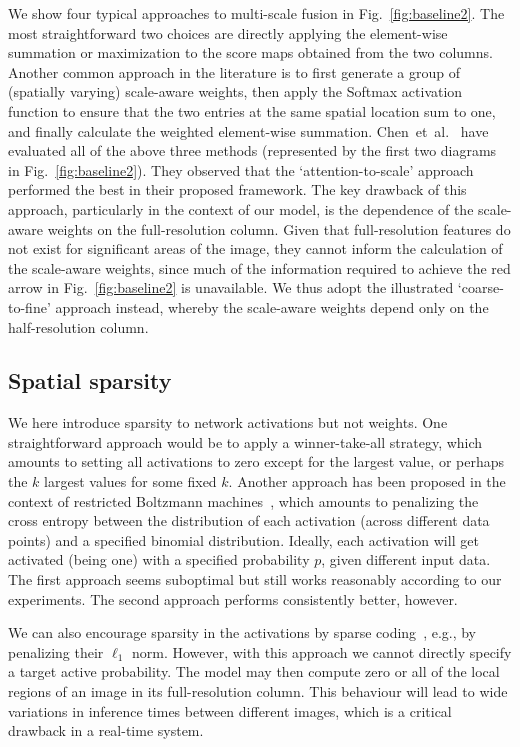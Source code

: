 \documentclass[10pt,twocolumn,letterpaper]{article}
\begin{document}
We show four typical approaches to multi-scale fusion in Fig.~\ref{fig:baseline2}.
The most straightforward two choices are directly applying the element-wise summation or maximization to the score maps obtained from the two columns.
Another common approach in the literature is to first generate a group of (spatially varying) scale-aware weights,
then apply the Softmax activation function to ensure that the two entries at the same spatial location sum to one,
and finally calculate the weighted element-wise summation.
Chen~et~al.~\cite{Attention2Scale.2015.Chen} have evaluated all of the above three methods (represented by the first two diagrams in Fig.~\ref{fig:baseline2}).
They observed that the `attention-to-scale' approach performed the best in their proposed framework.
The key drawback of this approach,
particularly in the context of our model,
is the dependence of the scale-aware weights on the full-resolution column.
%
%
%
%
%
%
Given that full-resolution features do not exist for significant areas of the image,
they cannot inform the calculation of the scale-aware weights,
since much of the information required to achieve the red arrow in Fig.~\ref{fig:baseline2} is unavailable.
We thus adopt the illustrated `coarse-to-fine' approach instead,
whereby the scale-aware weights depend only on the half-resolution column.


\subsection{Spatial sparsity}
We here introduce sparsity to network activations but not weights.
One straightforward approach would be to apply a winner-take-all strategy,
which amounts to setting all activations to zero except for the largest value, or perhaps the $k$ largest values for some fixed $k$.
Another approach has been proposed in the context of restricted Boltzmann machines~\cite{TrainRBM.2010.Hinton},
which amounts to penalizing the cross entropy between the distribution of each activation (across different data points) and a specified binomial distribution.
Ideally, each activation will get activated (being one) with a specified probability $p$,
given different input data.
The first approach seems suboptimal but still works reasonably according to our experiments.
%
The second approach performs consistently better, however.

We can also encourage sparsity in the activations by sparse coding~\cite{SparseCodingNetwork.2017.Sun},
e.g., by penalizing their $\ell_1$ norm.
However, with this approach we cannot directly specify a target active probability.
The model may then compute zero or all of the local regions of an image in its full-resolution column.
This behaviour will lead to wide variations in inference times between different images,
which is a critical drawback in a real-time system.
\end{document}
